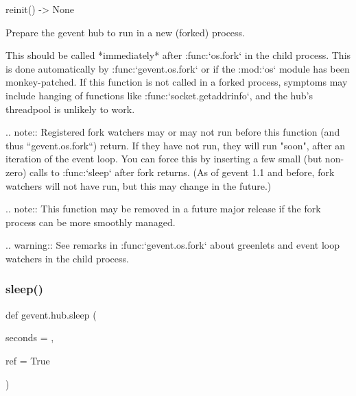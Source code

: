 \begin{DoxyVerb}reinit() -> None

Prepare the gevent hub to run in a new (forked) process.

This should be called *immediately* after :func:`os.fork` in the
child process. This is done automatically by
:func:`gevent.os.fork` or if the :mod:`os` module has been
monkey-patched. If this function is not called in a forked
process, symptoms may include hanging of functions like
:func:`socket.getaddrinfo`, and the hub's threadpool is unlikely
to work.

.. note:: Registered fork watchers may or may not run before
   this function (and thus ``gevent.os.fork``) return. If they have
   not run, they will run "soon", after an iteration of the event loop.
   You can force this by inserting a few small (but non-zero) calls to :func:`sleep`
   after fork returns. (As of gevent 1.1 and before, fork watchers will
   not have run, but this may change in the future.)

.. note:: This function may be removed in a future major release
   if the fork process can be more smoothly managed.

.. warning:: See remarks in :func:`gevent.os.fork` about greenlets
   and event loop watchers in the child process.
\end{DoxyVerb}
 \mbox{\label{namespacegevent_1_1hub_adde072af231e1bac3f14955a7a0e0025}} 
\subsubsection{\texorpdfstring{sleep()}{sleep()}}
{\footnotesize\ttfamily def gevent.\+hub.\+sleep (\begin{DoxyParamCaption}\item[{}]{seconds = {},  }\item[{}]{ref = {\ttfamily True} }\end{DoxyParamCaption})}

